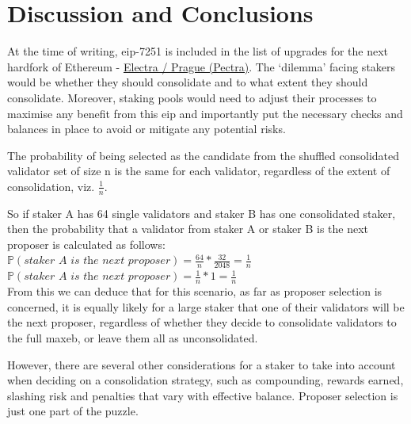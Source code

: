 \documentclass[submission,copyright,creativecommons]{eptcs}
\newcommand{\prob}{\mathbb P}
\begin{document}
\section{Discussion and Conclusions}
\label{sec:discussion}
At the time of writing, \gls{eip}-7251 is included in the list of upgrades for the next hardfork of Ethereum -  \href{https://ethereum-magicians.org/t/pectra-network-upgrade-meta-thread/16809}{Electra / Prague (Pectra)}. The `dilemma' facing stakers would be whether they should consolidate and to what extent they should consolidate. Moreover, staking pools would need to adjust their processes to maximise any benefit from this \gls{eip} and importantly put the necessary checks and balances in place to avoid or mitigate any potential risks.

The probability of being selected as the candidate from the shuffled consolidated validator set of size n is the same for each validator, regardless of the extent of consolidation, viz. $\frac{1}{n}$.

So if staker A has 64 single validators and staker B has one consolidated staker, then the probability that a validator from staker A or staker B is the next proposer is calculated as follows: \\

\noindent
$\prob(\textit{staker A is the next proposer}) = \frac{64}{n} * \frac{32}{2048} = \frac{1}{n}$ \\
\noindent
$\prob(\textit{staker A is the next proposer}) = \frac{1}{n} * 1 = \frac{1}{n}$ \\

From this we can deduce that for this scenario, as far as proposer selection is concerned, it is equally likely for a large staker that one of their validators will be the next proposer, regardless of whether they decide to consolidate validators to the full \gls{maxeb}, or leave them all as unconsolidated.

However, there are several other considerations for a staker to take into account when deciding on a consolidation strategy, such as compounding, rewards earned, slashing risk and penalties that vary with effective balance. Proposer selection is just one part of the puzzle.

\nocite{*}


\end{document}
